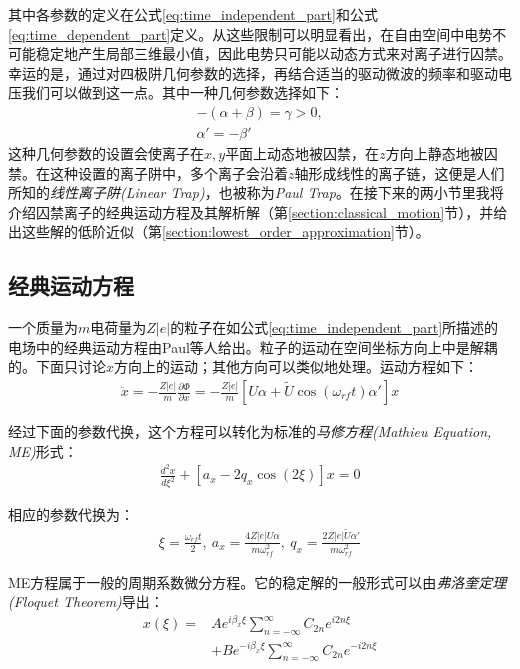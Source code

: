 其中各参数的定义在公式\eqref{eq:time_independent_part}和公式\eqref{eq:time_dependent_part}定义。从这些限制可以明显看出，在自由空间中电势不可能稳定地产生局部三维最小值，因此电势只可能以动态方式来对离子进行囚禁。幸运的是，通过对四极阱几何参数的选择，再结合适当的驱动微波的频率和驱动电压我们可以做到这一点。其中一种几何参数选择如下：
\begin{align}
    -(\alpha + \beta )= \gamma > 0,\\
    \alpha ' = - \beta '
\end{align}
这种几何参数的设置会使离子在$x,y$平面上动态地被囚禁，在$z$方向上静态地被囚禁。在这种设置的离子阱中，多个离子会沿着$z$轴形成线性的离子链，这便是人们所知的\emph{线性离子阱(Linear Trap)}，也被称为\emph{Paul Trap}\cite[]{Paul_1990}。在接下来的两小节里我将介绍囚禁离子的经典运动方程及其解析解（第\ref{section:classical_motion}节），并给出这些解的低阶近似（第\ref{section:lowest_order_approximation}节）。

\subsection[经典运动方程]{经典运动方程\label{section:classical_motion}}

一个质量为$m$电荷量为$Z|e|$的粒子在如公式\eqref{eq:time_independent_part}所描述的电场中的经典运动方程由Paul等人\cite[p415]{Paul1958}给出。粒子的运动在空间坐标方向上中是解耦的。下面只讨论$x$方向上的运动；其他方向可以类似地处理。运动方程如下：
\begin{align}
    \ddot{x}=-\frac{Z|e|}{m}\frac{\partial \Phi}{\partial x}=-\frac{Z|e|}{m}[U\alpha + \tilde{U}\cos(\omega_{rf}t)\alpha ']x
\end{align}

经过下面的参数代换，这个方程可以转化为标准的\emph{马修方程(Mathieu Equation, ME)}形式：
\begin{align}
    \frac{d^2x}{d\xi^2}+[a_x-2q_x\cos(2\xi)]x=0\label{eq:mathieu_equation}
\end{align}

相应的参数代换为：
\begin{align}
    \xi=\frac{\omega_{rf}t}{2},\ a_x=\frac{4Z|e|U\alpha}{m\omega_{rf}^2},\ q_x=\frac{2Z|e|\tilde{U}\alpha '}{m\omega_{rf}^2}\label{eq:parameters_substitution}
\end{align}

ME方程属于一般的周期系数微分方程。它的稳定解的一般形式可以由\emph{弗洛奎定理(Floquet Theorem)}导出\cite[]{McLachlan, McQuarrie}：
\begin{align}
    x(\xi)=&Ae^{i\beta_x\xi}\sum_{n=-\infty}^{\infty}C_{2n}e^{i2n\xi}\\
    &+ Be^{-i\beta_x\xi}\sum_{n=-\infty}^{\infty}C_{2n}e^{-i2n\xi}\label{eq:mathieu_solution}
\end{align}

